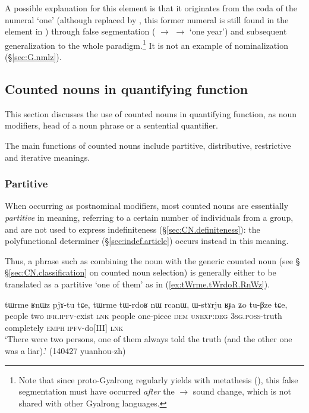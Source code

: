 A possible explanation for this  element is that it originates from the coda of the numeral `one' (although replaced by , this former numeral is still found in the element  in ) through false segmentation ( $\rightarrow$  $\rightarrow$  `one year') and subsequent generalization to the whole paradigm.\footnote{Note that since proto-Gyalrong  regularly yields  with metathesis (\citealt[272]{jacques04these}), this false segmentation must have occurred \textit{after} the  $\rightarrow$ sound change, which is not shared with other Gyalrong languages. } It is not an example of  nominalization (§\ref{sec:G.nmlz}).


\subsection{Counted nouns in quantifying function} \label{sec:CN.quantifier}
This section discusses the use of counted nouns in  quantifying function, as noun modifiers, head of a noun phrase or a sentential quantifier.

The main functions of counted nouns include partitive, distributive, restrictive and iterative meanings.

\subsubsection{Partitive} \label{sec:CN.partitive}
When occurring as postnominal modifiers, most counted nouns are essentially \textit{partitive} in meaning, referring to a certain number of individuals from a group, and are not used to express indefiniteness (§\ref{sec:CN.definiteness}): the polyfunctional determiner   (§\ref{sec:indef.article}) occurs instead in this meaning.

Thus, a phrase such as   combining the noun  with the generic counted noun  (see § §\ref{sec:CN.classification} on counted noun selection) is generally either to be translated as a partitive `one of them'  as in (\ref{ex:tWrme.tWrdoR.RnWz}).

\begin{exe}
	\ex \label{ex:tWrme.tWrdoR.RnWz}
	\gll tɯrme ʁnɯz pjɤ-tu tɕe, tɯrme tɯ-rdoʁ nɯ rcanɯ, ɯ-stɤrju ʁɟa ʑo tu-βze tɕe, \\
	people two \textsc{ifr}.\textsc{ipfv}-exist \textsc{lnk} people one-piece \textsc{dem} \textsc{unexp}:\textsc{deg} \textsc{3sg}.\textsc{poss}-truth completely \textsc{emph} \textsc{ipfv}-do[III] \textsc{lnk} \\
	\glt `There were two persons, one of them always told the truth (and the other one was a liar).' (140427 yuanhou-zh)
\end{exe} 

